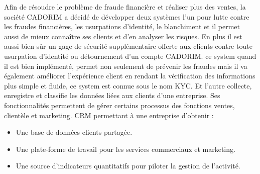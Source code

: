 Afin de résoudre le problème de fraude financière et réaliser plus des ventes, la société CADORIM a décidé de développer deux systèmes l'un pour lutte contre les fraudes financières, les usurpations d’identité, le blanchiment et il permet aussi de mieux connaître ses clients et d’en analyser les risques.
En plus il  est aussi bien sûr un gage de sécurité supplémentaire offerte aux clients contre toute usurpation d’identité ou détournement d’un compte CADORIM. ce system quand il est bien implémenté, permet non seulement de prévenir les fraudes mais il va également améliorer l’expérience client en  rendant la vérification des informations plus simple et fluide, ce system est connue sous le nom KYC.
Et l'autre collecte, enregistre et classifie les données liées aux clients d’une entreprise. Ses fonctionnalités permettent de gérer certains processus des fonctions ventes, clientèle et marketing.
CRM permettant à une entreprise d'obtenir :
\begin{itemize}[label=$\ast$]
\item Une base de données clients partagée.
\item Une plate-forme de travail pour les services commerciaux et marketing.
\item Une source d’indicateurs quantitatifs pour piloter la gestion de l’activité.
\end{itemize}

